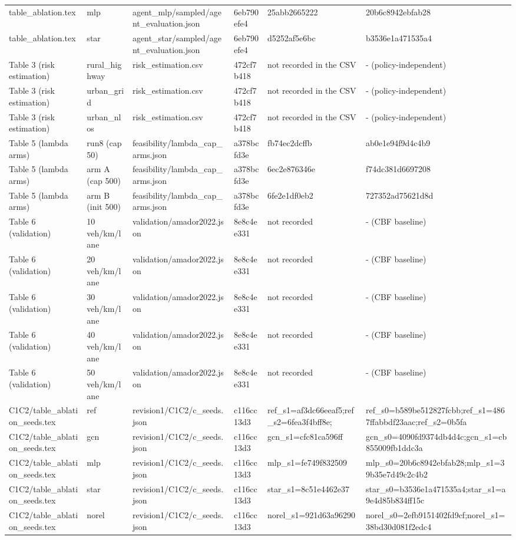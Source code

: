 \begin{tabular}{llllll}
table\_ablation.tex & mlp & agent\_mlp/sampled/agent\_evaluation.json & 6eb790efe4 & 25abb2665222 & 20b6c8942ebfab28 \\
table\_ablation.tex & star & agent\_star/sampled/agent\_evaluation.json & 6eb790efe4 & d5252af5e6bc & b3536e1a471535a4 \\
Table 3 (risk estimation) & rural\_highway & risk\_estimation.csv & 472cf7b418 & not recorded in the CSV & - (policy-independent) \\
Table 3 (risk estimation) & urban\_grid & risk\_estimation.csv & 472cf7b418 & not recorded in the CSV & - (policy-independent) \\
Table 3 (risk estimation) & urban\_nlos & risk\_estimation.csv & 472cf7b418 & not recorded in the CSV & - (policy-independent) \\
Table 5 (lambda arms) & run8 (cap 50) & feasibility/lambda\_cap\_arms.json & a378bcfd3e & fb74ec2dcffb & ab0e1e94f9d4c4b9 \\
Table 5 (lambda arms) & arm A (cap 500) & feasibility/lambda\_cap\_arms.json & a378bcfd3e & 6ec2e876346e & f74dc381d6697208 \\
Table 5 (lambda arms) & arm B (init 500) & feasibility/lambda\_cap\_arms.json & a378bcfd3e & 6fe2e1df0eb2 & 727352ad75621d8d \\
Table 6 (validation) & 10 veh/km/lane & validation/amador2022.json & 8e8c4ee331 & not recorded & - (CBF baseline) \\
Table 6 (validation) & 20 veh/km/lane & validation/amador2022.json & 8e8c4ee331 & not recorded & - (CBF baseline) \\
Table 6 (validation) & 30 veh/km/lane & validation/amador2022.json & 8e8c4ee331 & not recorded & - (CBF baseline) \\
Table 6 (validation) & 40 veh/km/lane & validation/amador2022.json & 8e8c4ee331 & not recorded & - (CBF baseline) \\
Table 6 (validation) & 50 veh/km/lane & validation/amador2022.json & 8e8c4ee331 & not recorded & - (CBF baseline) \\
C1C2/table\_ablation\_seeds.tex & ref & revision1/C1C2/c\_seeds.json & c116cc13d3 & ref\_s1=af3dc66eeaf5;ref\_s2=6fea3f4bff8e; & ref\_s0=b589be512827fcbb;ref\_s1=4867ffabbdf23aac;ref\_s2=0b5fa \\
C1C2/table\_ablation\_seeds.tex & gcn & revision1/C1C2/c\_seeds.json & c116cc13d3 & gcn\_s1=cfc81ca596ff & gcn\_s0=4090fd9374db4d4c;gcn\_s1=cb855009fb1ddc3a \\
C1C2/table\_ablation\_seeds.tex & mlp & revision1/C1C2/c\_seeds.json & c116cc13d3 & mlp\_s1=fe749f832509 & mlp\_s0=20b6c8942ebfab28;mlp\_s1=39b35e7d49c2c4b2 \\
C1C2/table\_ablation\_seeds.tex & star & revision1/C1C2/c\_seeds.json & c116cc13d3 & star\_s1=8c51e4462e37 & star\_s0=b3536e1a471535a4;star\_s1=a9e4d85b834ff15c \\
C1C2/table\_ablation\_seeds.tex & norel & revision1/C1C2/c\_seeds.json & c116cc13d3 & norel\_s1=921d63a96290 & norel\_s0=2efb9151402fd9cf;norel\_s1=38bd30d081f2edc4 \\
\bottomrule
\end{tabular}
